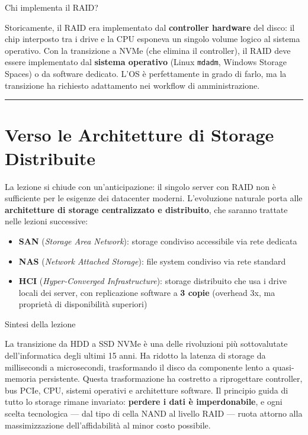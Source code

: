 \documentclass[
  italian,
  openany]{book}
\providecommand{\tightlist}{%
  \setlength{\itemsep}{0pt}\setlength{\parskip}{0pt}}
\begin{document}
\begin{calloutnote}{Chi implementa il RAID?}

Storicamente, il RAID era implementato dal \textbf{controller hardware}
del disco: il chip interposto tra i drive e la CPU esponeva un singolo
volume logico al sistema operativo. Con la transizione a NVMe (che
elimina il controller), il RAID deve essere implementato dal
\textbf{sistema operativo} (Linux \texttt{mdadm}, Windows Storage
Spaces) o da software dedicato. L'OS è perfettamente in grado di farlo,
ma la transizione ha richiesto adattamento nei workflow di
amministrazione.

\end{calloutnote}

\begin{center}\rule{0.5\linewidth}{0.5pt}\end{center}

\section{Verso le Architetture di Storage
Distribuite}\label{verso-le-architetture-di-storage-distribuite}

La lezione si chiude con un'anticipazione: il singolo server con RAID
non è sufficiente per le esigenze dei datacenter moderni. L'evoluzione
naturale porta alle \textbf{architetture di storage centralizzato e
distribuito}, che saranno trattate nelle lezioni successive:

\begin{itemize}
\tightlist
\item
  \textbf{SAN} (\emph{Storage Area Network}): storage condiviso
  accessibile via rete dedicata
\item
  \textbf{NAS} (\emph{Network Attached Storage}): file system condiviso
  via rete standard
\item
  \textbf{HCI} (\emph{Hyper-Converged Infrastructure}): storage
  distribuito che usa i drive locali dei server, con replicazione
  software a \textbf{3 copie} (overhead 3x, ma proprietà di
  disponibilità superiori)
\end{itemize}

\begin{calloutnote}{Sintesi della lezione}

La transizione da HDD a SSD NVMe è una delle rivoluzioni più
sottovalutate dell'informatica degli ultimi 15 anni. Ha ridotto la
latenza di storage da millisecondi a microsecondi, trasformando il disco
da componente lento a quasi-memoria persistente. Questa trasformazione
ha costretto a riprogettare controller, bus PCIe, CPU, sistemi operativi
e architetture software. Il principio guida di tutto lo storage rimane
invariato: \textbf{perdere i dati è imperdonabile}, e ogni scelta
tecnologica --- dal tipo di cella NAND al livello RAID --- ruota attorno
alla massimizzazione dell'affidabilità al minor costo possibile.

\end{calloutnote}
\end{document}
